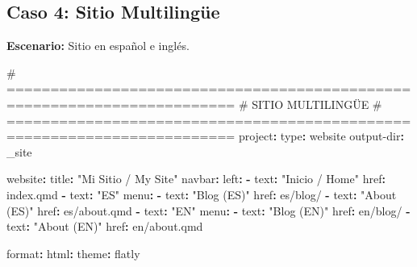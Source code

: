 \documentclass[
  doc,
  floatsintext,
  longtable,
  a4paper,
  nolmodern,
  notxfonts,
  notimes,
  12pt,
  colorlinks=true,linkcolor=blue,citecolor=blue,urlcolor=blue]{apa7}
\newenvironment{Shaded}{\begin{snugshade}}{\end{snugshade}}
\newcommand{\AttributeTok}[1]{\textcolor[rgb]{0.40,0.45,0.13}{#1}}
\newcommand{\CommentTok}[1]{\textcolor[rgb]{0.37,0.37,0.37}{#1}}
\newcommand{\FunctionTok}[1]{\textcolor[rgb]{0.28,0.35,0.67}{#1}}
\newcommand{\KeywordTok}[1]{\textcolor[rgb]{0.00,0.23,0.31}{\textbf{#1}}}
\newcommand{\StringTok}[1]{\textcolor[rgb]{0.13,0.47,0.30}{#1}}
\begin{document}
\subsection{Caso 4: Sitio
Multilingüe}\label{caso-4-sitio-multilinguxfce}

\textbf{Escenario:} Sitio en español e inglés.

\begin{Shaded}
\begin{Highlighting}[]
\CommentTok{\# ========================================================================}
\CommentTok{\# SITIO MULTILINGÜE}
\CommentTok{\# ========================================================================}
\FunctionTok{project}\KeywordTok{:}
\AttributeTok{  }\FunctionTok{type}\KeywordTok{:}\AttributeTok{ website}
\AttributeTok{  }\FunctionTok{output{-}dir}\KeywordTok{:}\AttributeTok{ \_site}

\FunctionTok{website}\KeywordTok{:}
\AttributeTok{  }\FunctionTok{title}\KeywordTok{:}\AttributeTok{ }\StringTok{"Mi Sitio / My Site"}
\AttributeTok{  }
\AttributeTok{  }\FunctionTok{navbar}\KeywordTok{:}
\AttributeTok{    }\FunctionTok{left}\KeywordTok{:}
\AttributeTok{      }\KeywordTok{{-}}\AttributeTok{ }\FunctionTok{text}\KeywordTok{:}\AttributeTok{ }\StringTok{"Inicio / Home"}
\AttributeTok{        }\FunctionTok{href}\KeywordTok{:}\AttributeTok{ index.qmd}
\AttributeTok{      }\KeywordTok{{-}}\AttributeTok{ }\FunctionTok{text}\KeywordTok{:}\AttributeTok{ }\StringTok{"ES"}
\AttributeTok{        }\FunctionTok{menu}\KeywordTok{:}
\AttributeTok{          }\KeywordTok{{-}}\AttributeTok{ }\FunctionTok{text}\KeywordTok{:}\AttributeTok{ }\StringTok{"Blog (ES)"}
\AttributeTok{            }\FunctionTok{href}\KeywordTok{:}\AttributeTok{ es/blog/}
\AttributeTok{          }\KeywordTok{{-}}\AttributeTok{ }\FunctionTok{text}\KeywordTok{:}\AttributeTok{ }\StringTok{"About (ES)"}
\AttributeTok{            }\FunctionTok{href}\KeywordTok{:}\AttributeTok{ es/about.qmd}
\AttributeTok{      }\KeywordTok{{-}}\AttributeTok{ }\FunctionTok{text}\KeywordTok{:}\AttributeTok{ }\StringTok{"EN"}
\AttributeTok{        }\FunctionTok{menu}\KeywordTok{:}
\AttributeTok{          }\KeywordTok{{-}}\AttributeTok{ }\FunctionTok{text}\KeywordTok{:}\AttributeTok{ }\StringTok{"Blog (EN)"}
\AttributeTok{            }\FunctionTok{href}\KeywordTok{:}\AttributeTok{ en/blog/}
\AttributeTok{          }\KeywordTok{{-}}\AttributeTok{ }\FunctionTok{text}\KeywordTok{:}\AttributeTok{ }\StringTok{"About (EN)"}
\AttributeTok{            }\FunctionTok{href}\KeywordTok{:}\AttributeTok{ en/about.qmd}

\FunctionTok{format}\KeywordTok{:}
\AttributeTok{  }\FunctionTok{html}\KeywordTok{:}
\AttributeTok{    }\FunctionTok{theme}\KeywordTok{:}\AttributeTok{ flatly}
\end{Highlighting}
\end{Shaded}
\end{document}
